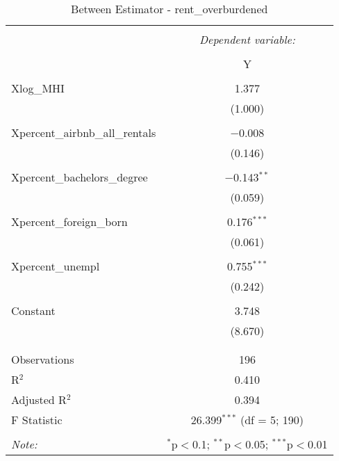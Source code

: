 \documentclass{article}
\begin{document}
\begin{table}[!htbp] \centering 
  \caption{Between Estimator - rent\_overburdened} 
  \label{} 
  \begin{tabular}{@{\extracolsep{5pt}}lc} 
    \\[-1.8ex]\hline 
    \hline \\[-1.8ex] 
    & \multicolumn{1}{c}{\textit{Dependent variable:}} \\ 
    \cline{2-2} 
    \\[-1.8ex] & Y \\ 
    \hline \\[-1.8ex] 
    Xlog\_MHI & 1.377 \\ 
    & (1.000) \\ 
    & \\ 
    Xpercent\_airbnb\_all\_rentals & $-$0.008 \\ 
    & (0.146) \\ 
    & \\ 
    Xpercent\_bachelors\_degree & $-$0.143$^{**}$ \\ 
    & (0.059) \\ 
    & \\ 
    Xpercent\_foreign\_born & 0.176$^{***}$ \\ 
    & (0.061) \\ 
    & \\ 
    Xpercent\_unempl & 0.755$^{***}$ \\ 
    & (0.242) \\ 
    & \\ 
    Constant & 3.748 \\ 
    & (8.670) \\ 
    & \\ 
    \hline \\[-1.8ex] 
    Observations & 196 \\ 
    R$^{2}$ & 0.410 \\ 
    Adjusted R$^{2}$ & 0.394 \\ 
    F Statistic & 26.399$^{***}$ (df = 5; 190) \\ 
    \hline 
    \hline \\[-1.8ex] 
    \textit{Note:}  & \multicolumn{1}{r}{$^{*}$p$<$0.1; $^{**}$p$<$0.05; $^{***}$p$<$0.01} \\ 
  \end{tabular} 
\end{table} 
\end{document}
